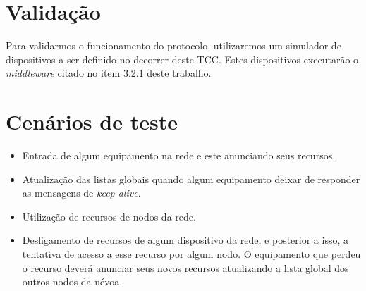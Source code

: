 \section{Validação}

Para validarmos o funcionamento do protocolo, utilizaremos um simulador de dispositivos a ser definido no decorrer deste TCC.
Estes dispositivos executarão o \textit{middleware} citado no item 3.2.1 deste trabalho.

\section{Cenários de teste}

\begin{itemize}
    \item Entrada de algum equipamento na rede e este anunciando seus recursos. 
    \item Atualização das listas globais quando algum equipamento deixar de responder as mensagens de \textit{keep alive}.
    \item Utilização de recursos de nodos da rede.
    \item Desligamento de recursos de algum dispositivo da rede, e posterior a isso, a tentativa de acesso a esse recurso por algum nodo.
    O equipamento que perdeu o recurso deverá anunciar seus novos recursos atualizando a lista global dos outros nodos da névoa.
\end{itemize}










